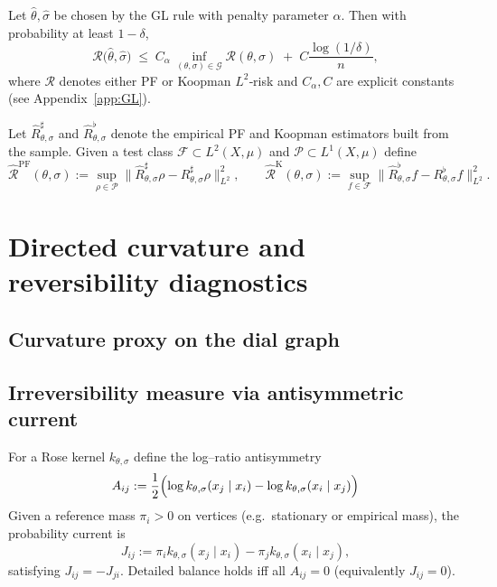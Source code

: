   		\begin{theorem}\label{thm:GL}
			Let $\widehat{\theta},\widehat{\sigma}$ be chosen by the GL rule
			with penalty parameter $\alpha$. Then with probability at least
			$1-\delta$,
			\[
  				\mathcal R\bigl(\widehat{\theta},\widehat{\sigma}\bigr)
 				\;\le\;
  				C_{\alpha}\,\inf_{(\theta,\sigma)\in\mathcal G}
      				\mathcal R(\theta,\sigma)
  				\;+\;
  				C\frac{\log(1/\delta)}{n},
			\]
			where $\mathcal R$ denotes either PF or Koopman $L^{2}$‑risk and
			$C_{\alpha},C$ are explicit constants (see Appendix~\ref{app:GL}).
		\end{theorem}
		
		\begin{definition}\label{def:sample-risk}
			Let $\widehat{R}^{\sharp}_{\theta,\sigma}$ and
			$\widehat{R}^{\flat}_{\theta,\sigma}$ denote the empirical PF and
			Koopman estimators built from the sample.
			Given a test class $\mathcal F\subset L^{2}(X,\mu)$ and
			$\mathcal P\subset L^{1}(X,\mu)$ define
			\[
				\widehat{\mathcal R}^{\mathrm{PF}}(\theta,\sigma)
  				:= \sup_{\rho\in\mathcal P}
       				\big\| \widehat{R}^{\sharp}_{\theta,\sigma}\rho
            			- R^{\sharp}_{\theta,\sigma}\rho \big\|_{L^{2}}^{2},
 				 \qquad
  				\widehat{\mathcal R}^{\mathrm{K}}(\theta,\sigma)
  				:= \sup_{f\in\mathcal F}
       				\big\| \widehat{R}^{\flat}_{\theta,\sigma}f
            			- R^{\flat}_{\theta,\sigma}f \big\|_{L^{2}}^{2}.
			\]
		\end{definition}

\section{Directed curvature and reversibility diagnostics}
	\subsection{Curvature proxy on the dial graph}
	\subsection{Irreversibility measure via antisymmetric current}
	
		\begin{definition}\label{def:Aij}
			For a Rose kernel $k_{\theta,\sigma}$ define the log--ratio antisymmetry
			\[
  				A_{ij} := \frac12
 		 		\Bigl(
    					\log k_{\theta,\sigma}(x_j\mid x_i)
    					- \log k_{\theta,\sigma}(x_i\mid x_j)
 				\Bigr)
			\]
			Given a reference mass $\pi_i>0$ on vertices (e.g.\ stationary or
			empirical mass), the probability current is
			\[
  				J_{ij} := \pi_i k_{\theta,\sigma}(x_j\mid x_i)
         	 		- \pi_j k_{\theta,\sigma}(x_i\mid x_j),
			\]
			satisfying $J_{ij}=-J_{ji}$.
			Detailed balance holds iff all $A_{ij}=0$ (equivalently $J_{ij}=0$).
		\end{definition}
		
